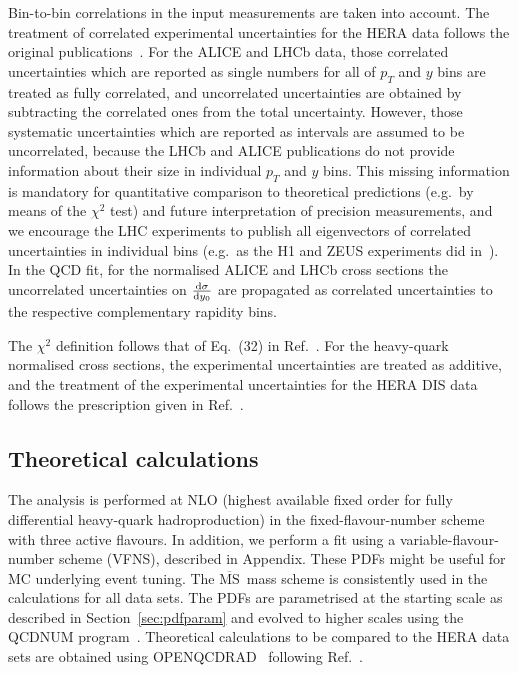 \documentclass[12pt]{article}
\newcommand{\msbar}{$\overline{\text{MS}}\, $\xspace}
\begin{document}
Bin-to-bin correlations in the input measurements are taken into account.
The treatment of correlated experimental uncertainties for the HERA data follows the original publications~\cite{Abramowicz:2015mha,H1:2018flt}.
For the ALICE and LHCb data, those correlated uncertainties which are reported as single numbers for all of $p_T$ and $y$ bins are treated as fully correlated, and uncorrelated uncertainties are obtained by subtracting the correlated ones from the total uncertainty. 
However, those systematic uncertainties which are reported as intervals are assumed to be uncorrelated, because the LHCb and ALICE publications do not provide information about their size in individual $p_T$ and $y$ bins. 
This missing information is mandatory for quantitative comparison to theoretical predictions (e.g.\ by means of the $\chi^2$ test) and future interpretation of precision measurements, and we encourage the LHC experiments to publish all eigenvectors of correlated uncertainties in individual bins (e.g.\ as the H1 and ZEUS experiments did in~\cite{Abramowicz:2015mha,H1:2018flt}).
In the QCD fit, for the normalised ALICE and LHCb cross sections the uncorrelated uncertainties on $\frac{{\rm d}\sigma}{{\rm d}y_0}$ are propagated as correlated uncertainties to the respective complementary rapidity bins. 

The $\chi^2$ definition follows that of Eq.~(32) in Ref.~\cite{Abramowicz:2015mha}.
For the heavy-quark normalised cross sections, the experimental uncertainties are treated as additive, and the treatment of the experimental uncertainties for the HERA DIS data follows the prescription given in Ref.~\cite{Abramowicz:2015mha}.

\subsection{Theoretical calculations}
\label{sec:th}

The analysis is performed at NLO (highest available fixed order for fully differential heavy-quark hadroproduction) in the fixed-flavour-number scheme with three active flavours.
In addition, we perform a fit using a variable-flavour-number scheme (VFNS), described in Appendix. These PDFs might be useful for MC underlying event tuning.
The \msbar mass scheme is consistently used in the calculations for all data sets.
The PDFs are parametrised at the starting scale as described in Section~\ref{sec:pdfparam} and evolved to higher scales using the QCDNUM program~\cite{Botje:2010ay}.
Theoretical calculations to be compared to the HERA data sets are obtained using OPENQCDRAD~\cite{openqcdrad} following Ref.~\cite{H1:2018flt}.
\end{document}
